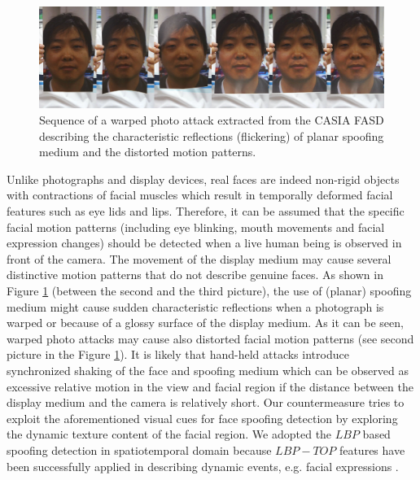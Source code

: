 \begin{figure}[!htb]
\begin{center}
\includegraphics [width=0.85\linewidth] {images/proposed_countermeasure/flicker.png}
\caption[Sequence of a warped photo attack extracted from the CASIA FASD]{Sequence of a warped photo attack extracted from the CASIA FASD \cite{zhangface} describing the characteristic reflections (flickering) of planar spoofing medium and the distorted motion patterns.} \label{fig:flickering}
\end{center}
\end{figure}

Unlike photographs and display devices, real faces are indeed non-rigid objects with contractions of facial muscles which result in temporally deformed facial features such as eye lids and lips. Therefore, it can be assumed that the specific facial motion patterns (including eye blinking, mouth movements and facial expression changes) should be detected when a live human being is observed in front of the camera. The movement of the display medium may cause several distinctive motion patterns that do not describe genuine faces. As shown in Figure \ref{fig:flickering} (between the second and the third picture), the use of (planar) spoofing medium might cause sudden characteristic reflections when a photograph is warped or because of a glossy surface of the display medium. As it can be seen, warped photo attacks may cause also distorted facial motion patterns (see second picture in the Figure \ref{fig:flickering}). It is likely that hand-held attacks introduce synchronized shaking of the face and spoofing medium which can be observed as excessive relative motion in the view and facial region if the distance between the display medium and the camera is relatively short. Our countermeasure tries to exploit the aforementioned visual cues for face spoofing detection by exploring the dynamic texture content of the facial region. We adopted the $LBP$ based spoofing detection in spatiotemporal domain because $LBP-TOP$ features have been successfully applied in describing dynamic events, e.g. facial expressions \citep{zhao2007dynamic}.

